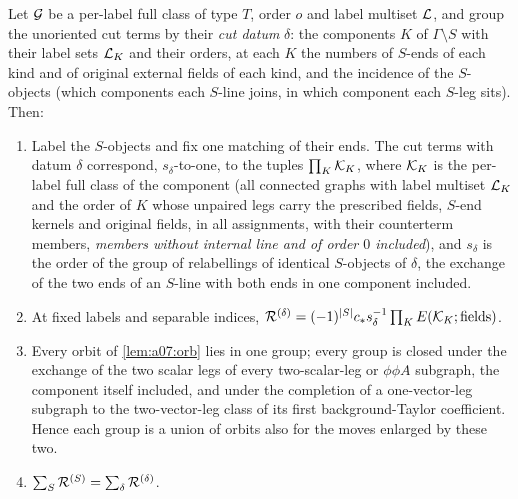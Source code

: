 
\begin{lemma}\label{lem:a07:full}
Let $\mathcal G$ be a per-label full class of type $T$, order $o$ and label multiset $\mathcal L$, and group the unoriented cut terms by their \emph{cut datum} $\delta$: the components $K$ of $\Gamma\setminus S$ with their label sets $\mathcal L_K$ and their orders, at each $K$ the numbers of $S$-ends of each kind and of original external fields of each kind, and the incidence of the $S$-objects (which components each $S$-line joins, in which component each $S$-leg sits). Then:
\begin{enumerate}[label=\textup{(\alph*)},nosep,leftmargin=*]
\item Label the $S$-objects and fix one matching of their ends. The cut terms with datum $\delta$ correspond, $s_\delta$-to-one, to the tuples $\prod_K\mathcal K_K$, where $\mathcal K_K$ is the per-label full class of the component (all connected graphs with label multiset $\mathcal L_K$ and the order of $K$ whose unpaired legs carry the prescribed fields, $S$-end kernels and original fields, in all assignments, with their counterterm members, \emph{members without internal line and of order $0$ included}), and $s_\delta$ is the order of the group of relabellings of identical $S$-objects of $\delta$, the exchange of the two ends of an $S$-line with both ends in one component included.
\item At fixed labels and separable indices, $\mathcal R^{(\delta)}=(-1)^{|S|}c_*s_\delta^{-1}\prod_KE(\mathcal K_K;\text{fields})$.
\item Every orbit of \cref{lem:a07:orb} lies in one group; every group is closed under the exchange of the two scalar legs of every two-scalar-leg or $\phi\phi A$ subgraph, the component itself included, and under the completion of a one-vector-leg subgraph to the two-vector-leg class of its first background-Taylor coefficient. Hence each group is a union of orbits also for the moves enlarged by these two.
\item $\sum_S\mathcal R^{(S)}=\sum_\delta\mathcal R^{(\delta)}$.
\end{enumerate}
\end{lemma}


